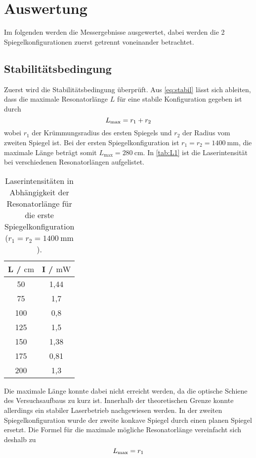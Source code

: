 \section{Auswertung}
\label{sec:Auswertung}
Im folgenden werden die Messergebnisse ausgewertet, dabei werden die 2 Spiegelkonfigurationen zuerst getrennt
voneinander betrachtet.

\subsection{Stabilitätsbedingung}
Zuerst wird die Stabilitätsbedingung überprüft.
Aus \eqref{eq:stabil} lässt sich ableiten, dass die maximale Resonatorlänge $L$ für eine
stabile Konfiguration gegeben ist durch
\begin{equation}
  \notag
  L_\text{max} = r_1 + r_2
\end{equation}
wobei $r_1$ der Krümmungsradius des ersten Spiegels und $r_2$ der Radius vom zweiten Spiegel ist.
Bei der ersten Spiegelkonfiguration ist $r_1=r_2=\qty{1400}{\milli\metre}$, die maximale Länge beträgt
somit $L_\text{max} = \qty{280}{\centi\metre}$. 
In \autoref{tab:L1} ist die Laserintensität bei verschiedenen Resonatorlängen aufgelistet.
\begin{table}[H]
  \centering
  \begin{tabular}{c|c}
    {L / $\unit{\centi\metre}$} & {I / $\unit{\milli\watt}$} \\
    \hline
    50  & 1,44  \\
    75  & 1,7  \\
    100  & 0,8  \\
    125  & 1,5  \\
    150  & 1,38  \\
    175  & 0,81   \\
    200  & 1,3 
  \end{tabular}
  \caption{Laserintensitäten in Abhängigkeit der Resonatorlänge für die erste Spiegelkonfiguration ($r_1=r_2=\qty{1400}{\milli\metre}$).}
  \label{tab:L1}
\end{table}
Die maximale Länge konnte dabei nicht erreicht werden, da die optische Schiene des Versuchsaufbaus zu kurz ist.
Innerhalb der theoretischen Grenze konnte allerdings ein stabiler Laserbetrieb nachgewiesen werden.
In der zweiten Spiegelkonfiguration wurde der zweite konkave Spiegel durch einen planen Spiegel ersetzt.
Die Formel für die maximale mögliche Resonatorlänge vereinfacht sich deshalb zu
\begin{equation}
  \notag
  L_\text{max} = r_1
\end{equation}
